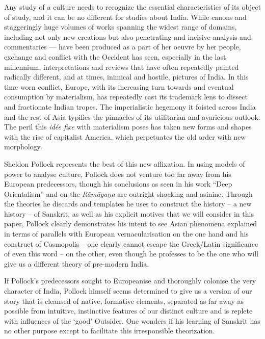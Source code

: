 Any study of a culture needs to recognize the essential characteristics of its object of study, and it can be no different for studies about India. While canons and staggeringly huge volumes of works spanning the widest range of domains, including not only new creations but also penetrating and incisive analysis and commentaries — have been produced as a part of her oeuvre by her people, exchange and conflict with the Occident has seen, especially in the last millennium, interpretations and reviews that have often repeatedly painted radically different, and at times, inimical and hostile, pictures of India. In this time worn conflict, Europe, with its increasing turn towards and eventual consumption by materialism, has repeatedly cast its trademark lens to dissect and fractionate Indian tropes. The imperialistic hegemony it foisted across India and the rest of Asia typifies the pinnacles of its utilitarian and avaricious outlook. The peril this \textit{idée fixe} with materialism poses has taken new forms and shapes with the rise of capitalist America, which perpetuates the old order with new morphology.

Sheldon Pollock represents the best of this new affixation. In using models of power to analyse culture, Pollock does not venture too far away from his European predecessors, though his conclusions as seen in his work “Deep Orientalism” and on the \textit{Rāmāyaṇa} are outright shocking and asinine. Through the theories he discards and templates he uses to construct the history – a new history – of Sanskrit, as well as his explicit motives that we will consider in this paper, Pollock clearly demonstrates his intent to see Asian phenomena explained in terms of parallels with European vernacularisation on the one hand and his construct of Cosmopolis – one clearly cannot escape the Greek/Latin significance of even this word – on the other, even though he professes to be the one who will give us a different theory of pre-modern India.

\newpage

If Pollock’s predecessors sought to Europeanise and thoroughly colonise the very character of India, Pollock himself seems determined to give us a version of our story that is cleansed of native, formative elements, separated as far away as possible from intuitive, instinctive features of our distinct culture and is replete with influences of the ‘good’ Outsider. One wonders if his learning of Sanskrit has no other purpose except to facilitate this irresponsible theorization.

